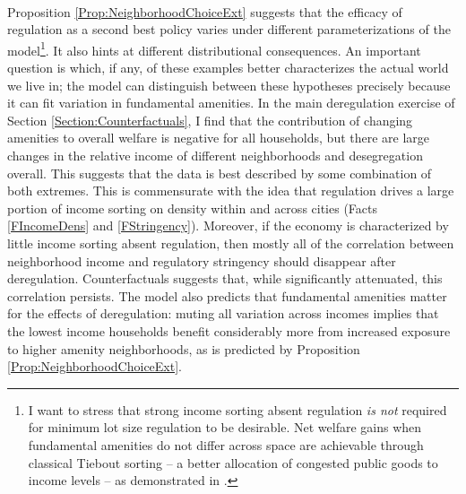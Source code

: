\documentclass[12pt]{article}
\begin{document}
\paragraph*{}
Proposition \ref{Prop:NeighborhoodChoiceExt}  suggests that the efficacy of regulation as a second best policy varies under different parameterizations of the model\footnote{I want to stress that strong income sorting absent regulation \textit{is not} required for minimum lot size regulation to be desirable. Net welfare gains when fundamental amenities do not differ across space are achievable through classical Tiebout sorting -- a better allocation of congested public goods to income levels -- as demonstrated in \cite{calabresetal}.}. It also hints at different distributional consequences. An important question is which, if any, of these examples better characterizes the actual world we live in; the model can distinguish between these hypotheses precisely because it can fit variation in fundamental amenities. In the main deregulation exercise of Section \ref{Section:Counterfactuals}, I find that the contribution of changing amenities to overall welfare is negative for all households, but there are large changes in the relative income of different neighborhoods and desegregation overall. This suggests that the data is best described by some combination of both extremes. This is commensurate with the idea that regulation drives a large portion of income sorting on density within and across cities (Facts \ref{FIncomeDens} and \ref{FStringency}). Moreover, if the economy is characterized by little income sorting absent regulation, then mostly all of the correlation between neighborhood income and regulatory stringency should disappear after deregulation. Counterfactuals suggests that, while significantly attenuated, this correlation persists. The model also predicts that fundamental amenities matter for the effects of deregulation: muting all variation across incomes implies that the lowest income households benefit considerably more from increased exposure to higher amenity neighborhoods, as is predicted by Proposition \ref{Prop:NeighborhoodChoiceExt}.

\end{document}
